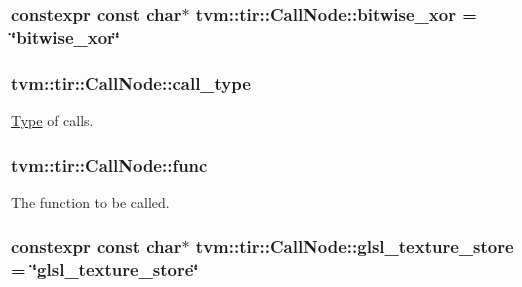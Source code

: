 \subsubsection[{\texorpdfstring{bitwise\+\_\+xor}{bitwise_xor}}]{\setlength{\rightskip}{0pt plus 5cm}constexpr const char$\ast$ tvm\+::tir\+::\+Call\+Node\+::bitwise\+\_\+xor = \char`\"{}bitwise\+\_\+xor\char`\"{}\hspace{0.3cm}{\ttfamily [static]}}\hypertarget{classtvm_1_1tir_1_1CallNode_a615ddb84f79dfdf60b2bebba0e9c98fe}{}\label{classtvm_1_1tir_1_1CallNode_a615ddb84f79dfdf60b2bebba0e9c98fe}
\subsubsection[{\texorpdfstring{call\+\_\+type}{call_type}}]{ tvm\+::tir\+::\+Call\+Node\+::call\+\_\+type}\hypertarget{classtvm_1_1tir_1_1CallNode_aa0fadf83d2540a578ffbc6a673a94fb5}{}\label{classtvm_1_1tir_1_1CallNode_aa0fadf83d2540a578ffbc6a673a94fb5}


\hyperlink{classtvm_1_1Type}{Type} of calls. 

\subsubsection[{\texorpdfstring{func}{func}}]{ tvm\+::tir\+::\+Call\+Node\+::func}\hypertarget{classtvm_1_1tir_1_1CallNode_afbdbda11e2bc1c47c3bcbaed9a9983e4}{}\label{classtvm_1_1tir_1_1CallNode_afbdbda11e2bc1c47c3bcbaed9a9983e4}


The function to be called. 

\subsubsection[{\texorpdfstring{glsl\+\_\+texture\+\_\+store}{glsl_texture_store}}]{\setlength{\rightskip}{0pt plus 5cm}constexpr const char$\ast$ tvm\+::tir\+::\+Call\+Node\+::glsl\+\_\+texture\+\_\+store = \char`\"{}glsl\+\_\+texture\+\_\+store\char`\"{}\hspace{0.3cm}{\ttfamily [static]}}\hypertarget{classtvm_1_1tir_1_1CallNode_adaa0f8782aaa0affe1b98e4353811149}{}\label{classtvm_1_1tir_1_1CallNode_adaa0f8782aaa0affe1b98e4353811149}
